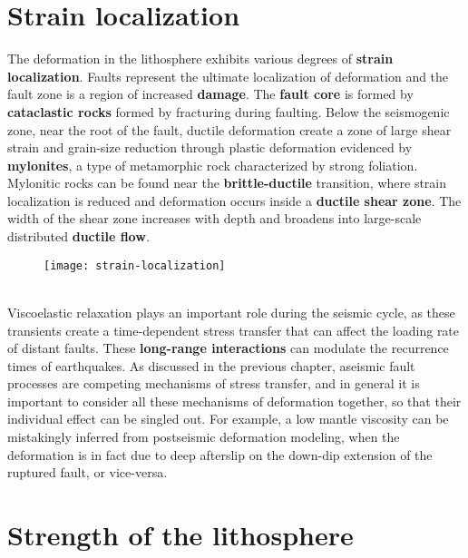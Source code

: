 \documentclass[letterpaper,12pt,]{memoir}
\begin{document}
\section{Strain localization}

The deformation in the lithosphere exhibits various degrees of \textbf{strain localization}. Faults represent the ultimate localization of deformation and the fault zone is a region of increased \textbf{damage}. The \textbf{fault core} is formed by \textbf{cataclastic rocks} formed by fracturing during faulting. Below the seismogenic zone, near the root of the fault, ductile deformation create a zone of large shear strain and grain-size reduction through plastic deformation evidenced by \textbf{mylonites}, a type of metamorphic rock characterized by strong foliation. Mylonitic rocks can be found near the \textbf{brittle-ductile} transition, where strain localization is reduced and deformation occurs inside a \textbf{ductile shear zone}. The width of the shear zone increases with depth and broadens into large-scale distributed \textbf{ductile flow}.
%
\begin{figure}[h]
\begin{center}
\texttt{[image: strain-localization]}
\end{center}
\vspace{-0.5cm}
\end{figure}
%
\\
Viscoelastic relaxation plays an important role during the seismic cycle, as these transients create a time-dependent stress transfer that can affect the loading rate of distant faults. These \textbf{long-range interactions} can modulate the recurrence times of earthquakes. As discussed in the previous chapter, aseismic fault processes are competing mechanisms of stress transfer, and in general it is important to consider all these mechanisms of deformation together, so that their individual effect can be singled out. For example, a low mantle viscosity can be mistakingly inferred from postseismic deformation modeling, when the deformation is in fact due to deep afterslip on the down-dip extension of the ruptured fault, or vice-versa. 


\section{Strength of the lithosphere}
\end{document}
